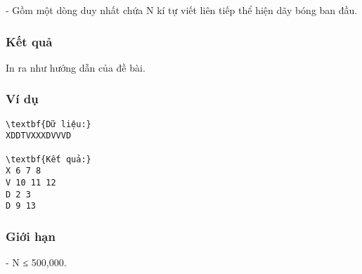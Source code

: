    - Gồm một dòng duy nhất chứa N kí tự viết liên tiếp thể hiện dãy bóng ban đầu.  

\subsubsection{   Kết quả  }

   In ra như hướng dẫn của đề bài.  

\subsubsection{   Ví dụ  }
\begin{verbatim}
\textbf{Dữ liệu:}
XDDTVXXXDVVVD

\textbf{Kết quả:}
X 6 7 8
V 10 11 12
D 2 3
D 9 13
\end{verbatim}

\subsubsection{   Giới hạn  }

   - N ≤ 500,000.  

